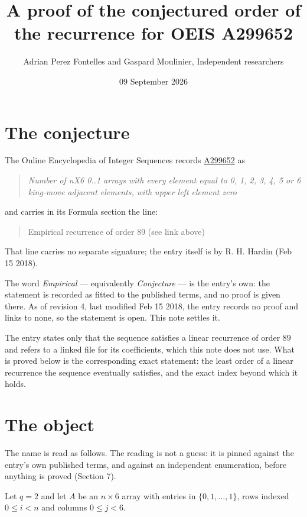 \documentclass[11pt]{article}
\title{A proof of the conjectured order of the recurrence for OEIS A299652}
\author{Adrian Perez Fontelles and Gaspard Moulinier, Independent researchers}
\date{09 September 2026}
\theoremstyle{definition}
\begin{document}
\maketitle
\section{The conjecture}

The Online Encyclopedia of Integer Sequences records \href{https://oeis.org/A299652}{A299652} as

\begin{quote}\itshape Number of nX6 0..1 arrays with every element equal to 0, 1, 2, 3, 4, 5 or 6 king-move adjacent elements, with upper left element zero\end{quote}

and carries in its Formula section the line:

\begin{quote}\ttfamily Empirical recurrence of order 89 (see link above)\end{quote}

That line carries no separate signature; the entry itself is by R. H. Hardin (Feb 15 2018).

The word {\itshape Empirical} --- equivalently {\itshape Conjecture} --- is the entry's own: the statement is recorded as fitted to the published terms, and no proof is given there. As of revision 4, last modified Feb 15 2018, the entry records no proof and links to none, so the statement is open. This note settles it.

The entry states only that the sequence satisfies a linear recurrence of order $89$ and refers to a linked file for its coefficients, which this note does not use. What is proved below is the corresponding exact statement: the least order of a linear recurrence the sequence eventually satisfies, and the exact index beyond which it holds.

\section{The object}

The name is read as follows. The reading is not a guess: it is pinned against the entry's own published terms, and against an independent enumeration, before anything is proved (Section 7).

Let $q = 2$ and let $A$ be an $n \times 6$ array with entries in $\{0,1,\dots,1\}$, rows indexed $0 \le i < n$ and columns $0 \le j < 6$.
\end{document}
